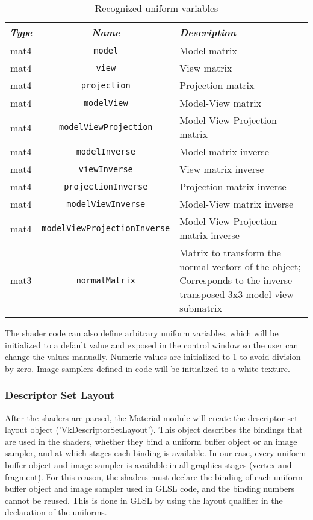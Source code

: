 \begin{table}[h]
    \centering
    \caption{Recognized uniform variables}
    \begin{tabular}{|c|c|p{6cm}|}
        \hline
        \textit{Type} & \textit{Name} & \textit{Description} \\
        \hline
        \hline
        mat4 & \texttt{model} & Model matrix \\
        mat4 & \texttt{view} & View matrix \\
        mat4 & \texttt{projection} & Projection matrix \\
        mat4 & \texttt{modelView} & Model-View matrix \\
        mat4 & \texttt{modelViewProjection} & Model-View-Projection matrix \\
        mat4 & \texttt{modelInverse} & Model matrix inverse \\
        mat4 & \texttt{viewInverse} & View matrix inverse \\
        mat4 & \texttt{projectionInverse} & Projection matrix inverse \\
        mat4 & \texttt{modelViewInverse} & Model-View matrix inverse \\
        mat4 & \texttt{modelViewProjectionInverse} & Model-View-Projection matrix inverse \\
        mat3 & \texttt{normalMatrix} & Matrix to transform the normal vectors of the object; Corresponds to the inverse transposed 3x3 model-view submatrix \\
        \hline
    \end{tabular}
    \label{tab:uniform_variables}
\end{table}

The shader code can also define arbitrary uniform variables, which will be initialized to a default value and exposed in the control window so the user can change the values manually. Numeric values are initialized to 1 to avoid division by zero. Image samplers defined in code will be initialized to a white texture.

\subsubsection{Descriptor Set Layout}
After the shaders are parsed, the Material module will create the descriptor set layout object ('VkDescriptorSetLayout'). This object describes the bindings that are used in the shaders, whether they bind a uniform buffer object or an image sampler, and at which stages each binding is available. In our case, every uniform buffer object and image sampler is available in all graphics stages (vertex and fragment). For this reason, the shaders must declare the binding of each uniform buffer object and image sampler used in GLSL code, and the binding numbers cannot be reused. This is done in GLSL by using the layout qualifier in the declaration of the uniforms.


